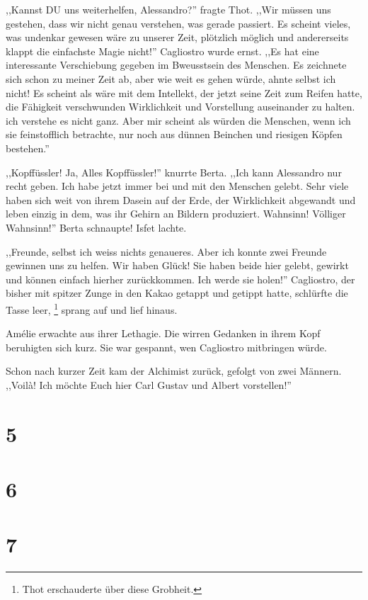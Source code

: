 ,,Kannst DU uns weiterhelfen, Alessandro?'' fragte Thot. ,,Wir müssen uns gestehen, dass wir nicht genau verstehen, was gerade passiert. Es scheint vieles, was undenkar gewesen wäre zu unserer Zeit, plötzlich möglich und andererseits klappt die einfachste Magie nicht!'' Cagliostro wurde ernst. ,,Es hat eine interessante Verschiebung gegeben im Bweusstsein des Menschen. Es zeichnete sich schon zu meiner Zeit ab, aber wie weit es gehen würde, ahnte selbst ich nicht! Es scheint als wäre mit dem Intellekt, der jetzt seine Zeit zum Reifen hatte, die Fähigkeit verschwunden Wirklichkeit und Vorstellung auseinander zu halten. ich verstehe es nicht ganz. Aber mir scheint als würden die Menschen, wenn ich sie feinstofflich betrachte, nur noch aus dünnen Beinchen und riesigen Köpfen bestehen.''

,,Kopffüssler! Ja, Alles Kopffüssler!'' knurrte Berta. ,,Ich kann Alessandro nur recht geben. Ich habe jetzt immer bei und mit den Menschen gelebt. Sehr viele haben sich weit von ihrem Dasein auf der Erde, der Wirklichkeit abgewandt und leben einzig in dem, was ihr Gehirn an Bildern produziert. Wahnsinn! Völliger Wahnsinn!'' Berta schnaupte! Isfet lachte. 

,,Freunde, selbst ich weiss nichts genaueres. Aber ich konnte zwei Freunde gewinnen uns zu helfen. Wir haben Glück! Sie haben beide hier gelebt, gewirkt und können einfach hierher zurückkommen. Ich werde sie holen!'' Cagliostro, der bisher mit spitzer Zunge in den Kakao getappt und getippt hatte, schlürfte die Tasse leer, \footnote{Thot erschauderte über diese Grobheit.} sprang auf und lief hinaus.

Amélie erwachte aus ihrer Lethagie. Die wirren Gedanken in ihrem Kopf beruhigten sich kurz. Sie war gespannt, wen Cagliostro mitbringen würde.

Schon nach kurzer Zeit kam der Alchimist zurück, gefolgt von zwei Männern. ,,Voilà! Ich möchte Euch hier Carl Gustav und Albert vorstellen!''

\section*{5}

\section*{6}

\section*{7}

